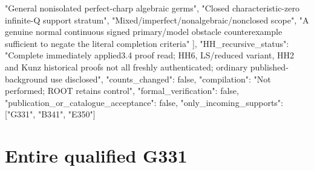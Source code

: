 \documentclass[11pt]{article}
\begin{document}
\begin{ImportedQualifiedGrant}
{    "General nonisolated perfect-charp algebraic germs",
    "Closed characteristic-zero infinite-Q support stratum",
    "Mixed/imperfect/nonalgebraic/nonclosed scope",
    "A genuine normal continuous signed primary/model obstacle counterexample sufficient to negate the literal completion criteria"
  ],
  "HH_recursive_status": "Complete immediately applied3.4 proof read; HH6, LS/reduced variant, HH2 and Kunz historical proofs not all freshly authenticated; ordinary published-background use disclosed",
  "counts_changed": false,
  "compilation": "Not performed; ROOT retains control",
  "formal_verification": false,
  "publication_or_catalogue_acceptance": false,
  "only_incoming_supports": ["G331", "B341", "E350"]
}


\end{ImportedQualifiedGrant}

\section{Entire qualified G331}
\end{document}
